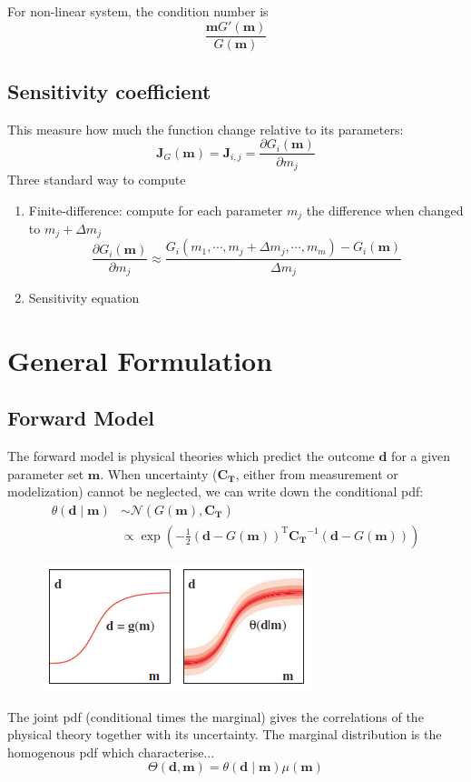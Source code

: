 \documentclass[twocolumn]{article}
\numberwithin{equation}{section}
\begin{document}
For non-linear system, the condition number is
$$\frac{\mathbf{m} G'(\mathbf{m})}{G(\mathbf{m})}$$



	\subsection{Sensitivity coefficient}
This measure how much the function change relative to its parameters:
$$\mathbf{J}_G(\mathbf{m})=\mathbf{J}_{i,j}=\frac{\partial G_i(\mathbf{m})}{\partial m_j}$$
Three standard way to compute
\begin{enumerate}
	\item Finite-difference: compute for each parameter $m_j$ the difference when changed to $m_j+\Delta m_j$
$$\frac{\partial G_i(\mathbf{m})}{\partial m_j}\approx \frac{ G_i(m_1,\cdots, m_j+\Delta m_j,\cdots,m_m)-G_i(\mathbf{m})}{\Delta m_j}$$
	\item Sensitivity equation
\end{enumerate}
 
 
 
 
 
 
 
 
\newpage
\section{General Formulation} 
 	\subsection{Forward Model}
The forward model is physical theories which predict the outcome $\mathbf{d}$ for a given parameter set $\mathbf{m}$. When uncertainty ($\mathbf{C_T}$, either from measurement or modelization) cannot be neglected, we can write down the conditional pdf: 
\begin{align*}
\theta(\mathbf{d \mid m})
&\sim \mathcal{N} (G(\mathbf{m}),\mathbf{C_T})\\ 
&\propto \exp \left( -\frac{1}{2} (\mathbf{d}-G(\mathbf{m}))^\mathrm{T} \mathbf{C_T}^{-1} (\mathbf{d}-G(\mathbf{m})) \right)
\end{align*}
\begin{figure}[H]
	\centering
	\includegraphics[width=.3\textwidth]{forwardmodel.png}
\end{figure}
The joint pdf (conditional times the marginal) gives the correlations of the physical theory together with its uncertainty. The marginal distribution is the homogenous pdf which characterise...
$$\Theta(\mathbf{d},\mathbf{m})=\theta(\mathbf{d \mid m}) \mu(\mathbf{m})$$
\end{document}

